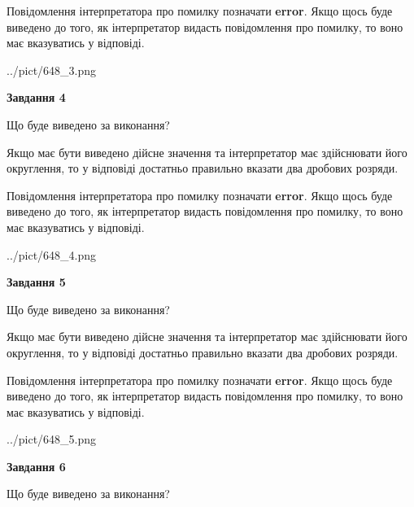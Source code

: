 \documentclass[12pt, ukrainian]{article}
\begin{document}
{\begin {Large}
Повідомлення інтерпретатора про помилку позначати \textbf{error}.
Якщо щось буде виведено до того, як інтерпретатор видасть повідомлення про помилку, 
то воно має вказуватись у відповіді. \par

\begin{center}
	{../pict/648_3.png}
\end{center}
\newpage

{\begin {center}\textbf{Завдання 4}\end {center}}\par
Що буде виведено за виконання? \par

Якщо має бути виведено дійсне значення та інтерпретатор має здійснювати його округлення, 
то у відповіді достатньо правильно вказати два дробових розряди.

Повідомлення інтерпретатора про помилку позначати \textbf{error}.
Якщо щось буде виведено до того, як інтерпретатор видасть повідомлення про помилку, 
то воно має вказуватись у відповіді. \par

\begin{center}
	{../pict/648_4.png}
\end{center}
\newpage

{\begin {center}\textbf{Завдання 5}\end {center}}\par
Що буде виведено за виконання? \par

Якщо має бути виведено дійсне значення та інтерпретатор має здійснювати його округлення, 
то у відповіді достатньо правильно вказати два дробових розряди.

Повідомлення інтерпретатора про помилку позначати \textbf{error}.
Якщо щось буде виведено до того, як інтерпретатор видасть повідомлення про помилку, 
то воно має вказуватись у відповіді. \par

\begin{center}
	{../pict/648_5.png}
\end{center}
\newpage

{\begin {center}\textbf{Завдання 6}\end {center}}\par
Що буде виведено за виконання? \par


\end{Large}}
\end{document}
